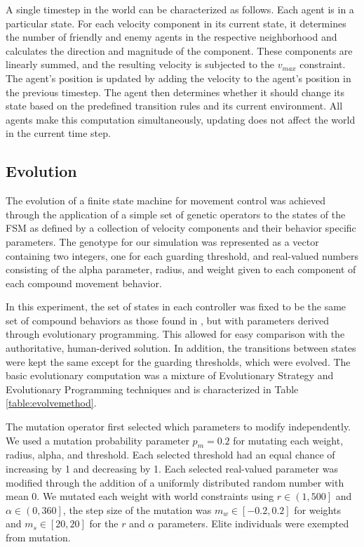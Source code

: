\documentclass[12pt,journal,compsoc]{IEEEtran}
\begin{document}
A single timestep in the world can be characterized as follows. Each agent is in a particular state. For each velocity component in its current state, it determines the number of friendly and enemy agents in the respective neighborhood and calculates the direction and magnitude of the component. These components are linearly summed, and the resulting velocity is subjected to the $v_{max}$ constraint. The agent's position is updated by adding the velocity to the agent's position in the previous timestep. The agent then determines whether it should change its state based on the predefined transition rules and its current environment. All agents make this computation simultaneously, updating does not affect the world in the current time step.

\subsection{Evolution}

The evolution of a finite state machine for movement control was achieved through the application of a simple set of genetic operators to the states of the FSM as defined by a collection of velocity components and their behavior specific parameters. The genotype for our simulation was represented as a vector containing two integers, one for each guarding threshold, and real-valued numbers consisting of the alpha parameter, radius, and weight given to each component of each compound movement behavior.

In this experiment, the set of states in each controller was fixed to be the same set of compound behaviors as those found in \cite{rodriguez2004extending}, but with parameters derived through evolutionary programming. This allowed for easy comparison with the authoritative, human-derived solution. In addition, the transitions between states were kept the same except for the guarding thresholds, which were evolved. The basic evolutionary computation was a mixture of Evolutionary Strategy and Evolutionary Programming techniques and is characterized in Table \ref{table:evolvemethod}.

The mutation operator first selected which parameters to modify independently. We used a mutation probability parameter $p_m=0.2$  for mutating each weight, radius, alpha, and threshold. Each selected threshold had an equal chance of increasing by 1 and decreasing by 1. Each selected real-valued parameter was modified through the addition of a uniformly distributed random number with mean 0. We mutated each weight with world constraints using $r\in\left(1,500\right]$ and $\alpha\in\left(0,360\right]$, the step size of the mutation was $m_w\in\left[-0.2,0.2\right]$ for weights and $m_s\in\left[20,20\right]$ for the $r$ and $\alpha$ parameters. Elite individuals were exempted from mutation.
\end{document}

